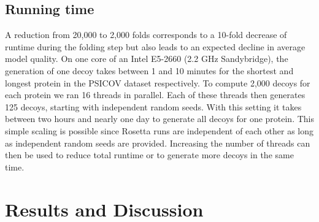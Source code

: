 \documentclass{bioinfo}
\begin{document}
\begin{methods}
\subsection{Running time}
A reduction from 20,000 to 2,000 folds corresponds to a 10-fold
decrease of runtime during the folding step but also leads to an
expected decline in average model quality. On one core of an Intel
E5-2660 (2.2 GHz Sandybridge), the generation of one decoy takes
between 1 and 10 minutes for the shortest and longest protein in the
PSICOV dataset respectively. To compute 2,000 decoys for each protein
we ran 16 threads in parallel.  Each of these threads then generates
125 decoys, starting with independent random seeds. With this setting
it takes between two hours and nearly one day to generate all decoys
for one protein.  This simple scaling is possible since Rosetta runs
are independent of each other as long as independent random seeds are
provided. Increasing the number of threads can then be used to reduce
total runtime or to generate more decoys in the same time.

\end{methods}


\section{Results and Discussion}
\end{document}
